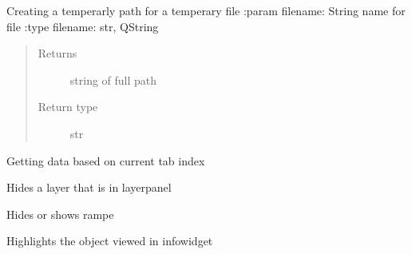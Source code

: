 \documentclass[letterpaper,10pt,english]{sphinxmanual}
\begin{document}
\begin{fulllineitems}
\begin{fulllineitems}
\label{\detokenize{code:Tilgjengelighet.Tilgjengelighet.get_temppath}}
Creating a temperarly path for a temperary file
:param filename: String name for file
:type filename: str, QString
\begin{quote}\begin{description}
\item[{Returns}] \leavevmode
string of full path

\item[{Return type}] \leavevmode
str

\end{description}\end{quote}

\end{fulllineitems}


\begin{fulllineitems}
\label{\detokenize{code:Tilgjengelighet.Tilgjengelighet.hentData}}
Getting data based on current tab index

\end{fulllineitems}


\begin{fulllineitems}
\label{\detokenize{code:Tilgjengelighet.Tilgjengelighet.hideLayer}}
Hides a layer that is in layerpanel

\end{fulllineitems}


\begin{fulllineitems}
\label{\detokenize{code:Tilgjengelighet.Tilgjengelighet.hide_show_rampe}}
Hides or shows rampe

\end{fulllineitems}


\begin{fulllineitems}
\label{\detokenize{code:Tilgjengelighet.Tilgjengelighet.highlightSelected}}
Highlights the object viewed in infowidget


\end{fulllineitems}
\end{fulllineitems}
\end{document}
